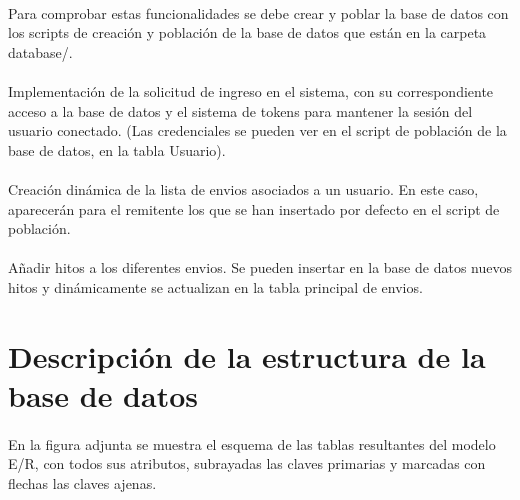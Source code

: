 \documentclass[10pt, a4paper,spanish]{article}
\begin{document}
		\paragraph{}
		Para comprobar estas funcionalidades se debe crear y poblar la base de datos con los scripts de creación y población de la base de datos que están en la carpeta database/.

		\paragraph{}
		Implementación de la solicitud de ingreso en el sistema, con su correspondiente acceso a la base de datos y el sistema de tokens para mantener la sesión del usuario conectado. (Las credenciales se pueden ver en el script de población de la base de datos, en la tabla Usuario).

		\paragraph{}
		Creación dinámica de la lista de envios asociados a un usuario. En este caso, aparecerán para el remitente los que se han insertado por defecto en el script de población.

		\paragraph{}
		Añadir hitos a los diferentes envios. Se pueden insertar en la base de datos nuevos hitos y dinámicamente se actualizan en la tabla principal de envios.
    \section{Descripción de la estructura de la base de datos}

    		\paragraph{}
		En la figura adjunta se muestra el esquema de las tablas resultantes del modelo E/R, con todos sus atributos, subrayadas las claves primarias y marcadas con flechas las claves ajenas.
\end{document}
